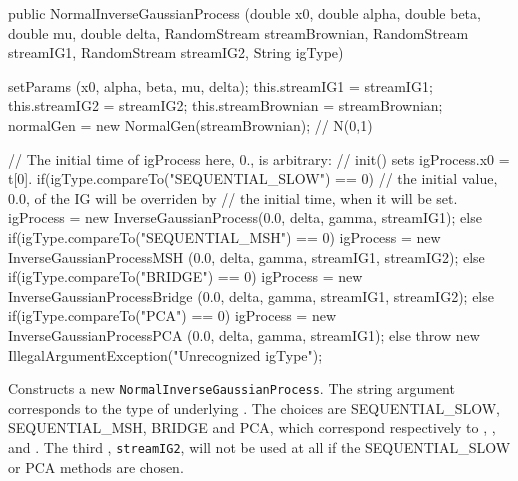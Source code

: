 \begin{code}

   public NormalInverseGaussianProcess (double x0, double alpha,
                                        double beta, double mu,
                                        double delta,
                                        RandomStream streamBrownian,
                                        RandomStream streamIG1,
                                        RandomStream streamIG2,
                                        String igType) \begin{hide} {
        setParams (x0, alpha, beta, mu, delta);
        this.streamIG1 = streamIG1;
        this.streamIG2 = streamIG2;
        this.streamBrownian = streamBrownian;
        normalGen = new NormalGen(streamBrownian); // N(0,1)

        // The initial time of igProcess here, 0., is arbitrary: 
        // init() sets igProcess.x0 = t[0].
        if(igType.compareTo("SEQUENTIAL_SLOW") == 0)
            // the initial value, 0.0, of the IG will be overriden by
            // the initial time, when it will be set.
            igProcess = new InverseGaussianProcess(0.0, delta, gamma, 
                                streamIG1);
        else if(igType.compareTo("SEQUENTIAL_MSH") == 0)
            igProcess = new InverseGaussianProcessMSH (0.0, delta, gamma, 
                                streamIG1, streamIG2);
        else if(igType.compareTo("BRIDGE") == 0)
            igProcess = new InverseGaussianProcessBridge (0.0, delta, gamma, 
                                streamIG1, streamIG2);
        else if(igType.compareTo("PCA") == 0)
            igProcess = new InverseGaussianProcessPCA (0.0, delta, gamma, 
                                streamIG1);
        else throw new IllegalArgumentException("Unrecognized igType");
    }\end{hide}
\end{code}
\begin{tabb} 
Constructs a new \texttt{Normal\-Inverse\-Gaussian\-Process}.
The string argument corresponds to the type of underlying
.  The choices are SEQUENTIAL\_SLOW,
SEQUENTIAL\_MSH, BRIDGE and PCA, which correspond
respectively to , ,
 and .
The third , \texttt{streamIG2},
will not be used at all if the SEQUENTIAL\_SLOW or PCA methods are chosen.
\end{tabb}
